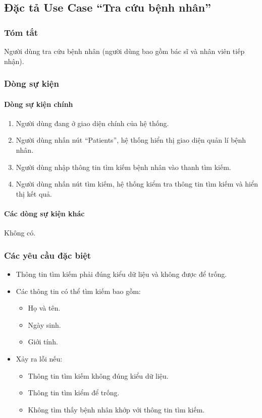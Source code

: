 \subsection{Đặc tả Use Case ``Tra cứu bệnh nhân''}

\subsubsection{Tóm tắt}
Người dùng tra cứu bệnh nhân (người dùng bao gồm bác sĩ và nhân viên tiếp nhận).

\subsubsection{Dòng sự kiện}
\paragraph{\textbf{Dòng sự kiện chính}}
\begin{enumerate}
  \item Người dùng đang ở giao diện chính của hệ thống.
  \item Người dùng nhấn nút ``Patients'', hệ thống hiển thị giao diện quản lí bệnh nhân.
  \item Người dùng nhập thông tin tìm kiếm bệnh nhân vào thanh tìm kiếm.
  \item Người dùng nhấn nút tìm kiếm, hệ thống kiểm tra thông tin tìm kiếm và hiển thị kết quả.
\end{enumerate}

\paragraph{\textbf{Các dòng sự kiện khác}}
Không có.

\subsubsection{Các yêu cầu đặc biệt}
\begin{itemize}
  \item Thông tin tìm kiếm phải đúng kiểu dữ liệu và không được để trống.
  \item Các thông tin có thể tìm kiếm bao gồm:
    \begin{itemize}
      \item Họ và tên.
      \item Ngày sinh.
      \item Giới tính.
    \end{itemize}
  \item Xảy ra lỗi nếu:
    \begin{itemize}
      \item Thông tin tìm kiếm không đúng kiểu dữ liệu.
      \item Thông tin tìm kiểm để trống.
      \item Không tìm thấy bệnh nhân khớp với thông tin tìm kiếm.
    \end{itemize}
\end{itemize}

